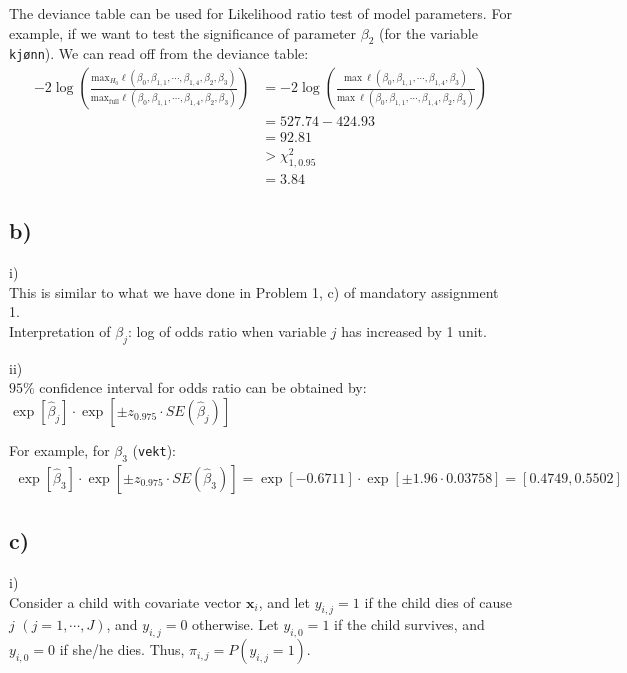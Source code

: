The deviance table can be used for Likelihood ratio test of model parameters. For example, if we want to test the significance of parameter $\beta_{2}$ (for the variable \texttt{kj{\o}nn}). We can read off from the deviance table:
\begin{align*}
-2\log\left(\frac{\mathrm{max}_{H_{0}}\ell\left(\beta_{0}, \beta_{1,1}, \cdots, \beta_{1,4}, \beta_{2}, \beta_{3}\right)}{\mathrm{max}_{\mathrm{full}}\ell\left(\beta_{0}, \beta_{1,1}, \cdots, \beta_{1,4}, \beta_{2}, \beta_{3}\right)}\right)
&= -2\log\left(\frac{\mathrm{max~}\ell\left(\beta_{0}, \beta_{1,1}, \cdots, \beta_{1,4}, \beta_{3}\right)}{\mathrm{max~}\ell\left(\beta_{0}, \beta_{1,1}, \cdots, \beta_{1,4}, \beta_{2}, \beta_{3}\right)}\right)\\
&= 527.74 - 424.93\\
&= 92.81\\
&> \chi_{1,0.95}^{2}\\
&= 3.84
\end{align*}


\vspace{\baselineskip}
\subsection{b)}
i)\\
This is similar to what we have done in  Problem 1, c) of mandatory assignment 1.\\
Interpretation of $\beta_{j}$: log of odds ratio when variable $j$ has increased by 1 unit.

ii)\\
$95\%$ confidence interval for odds ratio can be obtained by:\\
$\exp\left[\widehat{\beta}_{j}\right] \cdot \exp\left[\pm z_{0.975}\cdot SE(\widehat{\beta}_{j})\right]$

For example, for $\beta_{3}$ (\texttt{vekt}):
\begin{align*}
\exp\left[\widehat{\beta}_{3}\right] \cdot \exp\left[\pm z_{0.975}\cdot SE(\widehat{\beta}_{3})\right] = \exp\left[-0.6711\right] \cdot \exp\left[\pm 1.96\cdot 0.03758\right] = [0.4749, 0.5502]
\end{align*}


\vspace{\baselineskip}
\subsection{c)}
i)\\
Consider a child with covariate vector $\bm{x}_i$, and let $y_{i,j} = 1$ if the child dies of cause $j$ $(j = 1, \cdots, J)$, and $y_{i,j} = 0$ otherwise. Let $y_{i,0} = 1$ if the child survives, and $y_{i,0} = 0$ if she/he dies. Thus, $\pi_{i,j} = P(y_{i,j} = 1)$.\\

